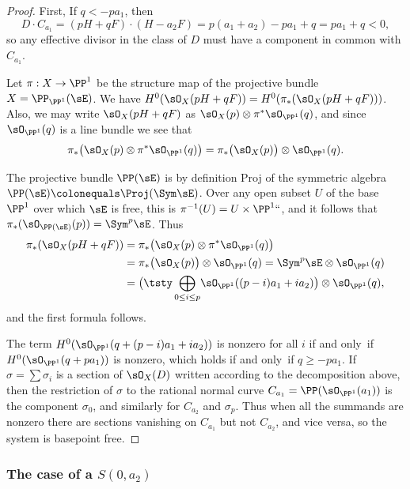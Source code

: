 \begin{proof} First, If $q<-pa_{1}$, then
$$
D\cdot C_{a_{1}} = (pH+qF) \cdot (H-a_{2}F) = p(a_{1}+a_{2}) -pa_{1}+q =
pa_{1}+q < 0,
$$
so any effective divisor in the class of $D$ must have a component in
common with $C_{a_{1}}$.

Let $\pi:X\to \PP^{1}$ be the structure map of the projective bundle $X
= \PP_{\PP^{1}}(\sE)$.
We have $H^{0}(\sO_{X}(pH+qF)) = H^{0}(\pi_{*}(\sO_{X}(pH+qF)))$. Also,
we may write $\sO_{X}(pH+qF)$ as $\sO_{X}(p) \otimes
\pi^{*}\sO_{\PP^{1}}(q)$, and since
$\sO_{\PP^{1}}(q)$ is a line bundle we see that
$$
\pi_{*}\bigl(\sO_{X}(p) \otimes \pi^{*}\sO_{\PP^{1}}(q)\bigr)
= \pi_{*}\bigl(\sO_{X}(p)\bigr)\otimes \sO_{\PP^{1}}(q).
$$

The projective bundle $\PP(\sE)$ is
by definition Proj of the symmetric algebra $\PP(\sE)\colonequals
\Proj(\Sym \sE)$. Over any open
subset $U$ of the base $\PP^1$ over which $\sE$ is free, this is
$\pi^{-1}(U) = U\times \PP^1` `$,
and it follows that $\pi_*(\sO_{\PP(\sE)}(p)) = \Sym^p\sE$.
Thus
\begin{align*}
\pi_{*}(\sO_{X}(pH+qF)) &=
\pi_{*}\bigl(\sO_{X}(p) \otimes \pi^{*}\sO_{\PP^{1}}(q)\bigr) \\
&= \pi_{*}\bigl(\sO_{X}(p)\bigr)\otimes \sO_{\PP^{1}}(q)
=  \Sym^{p} \sE\otimes \sO_{\PP^{1}}(q)\\
&=  \bigl(\tsty\bigoplus\limits_{0\leq i\leq p}\! \sO_{\PP^{1}}((p-i)a_{1}+i
a_{2})\bigr) \otimes \sO_{\PP^{1}}(q),
\end{align*}
and the first formula follows.

The term
$H^{0}(\sO_{\PP^{1}}(q + (p-i)a_{1}+i a_{2}))$ is nonzero for all $i$
if and only~if
$H^{0}(\sO_{\PP^{1}}(q + pa_{1}))$ is nonzero, which holds if and only~if
$q\geq -pa_{1}$.
If $\sigma = \sum \sigma_i$ is a section of $\sO_X(D)$ written according
to the decomposition
above, then the restriction of $\sigma$ to  the rational normal curve
$C_{a_1} = \PP(\sO_{\PP^1}(a_1))$ is the component $\sigma_0$, and
similarly for $C_{a_2}$ and $\sigma_p$. Thus when  all the summands
are nonzero
there are sections  vanishing on $C_{a_{1}}$ but not $C_{a_{2}}$, and
vice versa, so the system is basepoint free.
%
\end{proof}

\subsubsection*{The case of a 
$S(0,a_{2})$}

